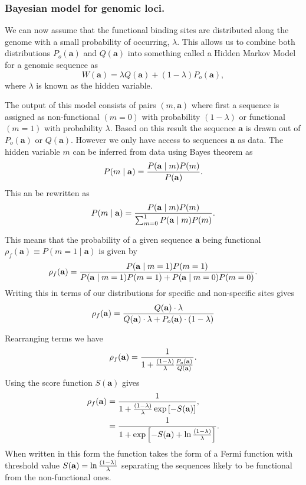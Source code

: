 \subsubsection{Bayesian model for genomic loci.}

We can now assume that the functional binding sites are distributed along the
genome with a small probability of occurring, $\lambda$. This allows us to
combine both distributions $P_o(\mathbf{a})$ and $Q(\mathbf{a})$ into something
called a Hidden Markov Model for a genomic sequence as
\begin{equation}
  W(\mathbf{a}) = \lambda Q(\mathbf{a}) + (1 - \lambda) P_o(\mathbf{a}),
\end{equation}
where $\lambda$ is known as the hidden variable.

The output of this model consists of pairs $(m, \mathbf{a})$ where first a
sequence is assigned as non-functional $(m=0)$ with probability $(1 - \lambda)$
or functional $(m=1)$ with probability $\lambda$. Based on this result the
sequence $\mathbf{a}$ is drawn out of $P_o(\mathbf{a})$ or $Q(\mathbf{a})$.
However we only have access to sequences $\mathbf{a}$ as data. The hidden
variable $m$ can be inferred from data using Bayes theorem as
\begin{equation}
  P(m \mid \mathbf{a}) = {P(\mathbf{a} \mid m) P(m) \over P(\mathbf{a})}.
\end{equation}
This an be rewritten as
\begin{equation}
  P(m \mid \mathbf{a}) = {P(\mathbf{a} \mid m) P(m) \over
  \sum_{m=0}^1 P(\mathbf{a} \mid m) P(m)}.
\end{equation}

This means that the probability of a given sequence $\mathbf{a}$ being
functional $\rho_f(\mathbf{a}) \equiv P(m=1\mid \mathbf{a})$ is given by
\begin{equation}
  \rho_f(\mathbf{a}) = {P(\mathbf{a} \mid m=1) P(m=1) \over
  P(\mathbf{a} \mid m=1) P(m=1) + P(\mathbf{a} \mid m=0) P(m=0)}.
\end{equation}
Writing this in terms of our distributions for specific and non-specific sites
gives
\begin{equation}
  \rho_f(\mathbf{a}) = {Q(\mathbf{a}) \cdot \lambda \over
  Q(\mathbf{a}) \cdot \lambda + P_o(\mathbf{a}) \cdot (1 - \lambda)}
\end{equation}

Rearranging terms we have
\begin{equation}
  \rho_f(\mathbf{a}) = {1 \over 1 + {(1 - \lambda) \over \lambda}
  {P_o(\mathbf{a}) \over Q(\mathbf{a})}}.
\end{equation}
Using the score function $S(\mathbf{a})$ gives
\begin{align}
  \rho_f(\mathbf{a}) &= {1  \over 1 + {(1 - \lambda) \over \lambda}
  \exp\left[ - S(\mathbf{a}) \right]},\\
  &= {1  \over 1 + \exp\left[ - S(\mathbf{a}) + \ln {(1 - \lambda) \over
  \lambda} \right]}.
\end{align}
When written in this form the function takes the form of a Fermi function with
threshold value $S(\mathbf{a}) = \ln {(1 - \lambda) \over \lambda}$ separating
the sequences likely to be functional from the non-functional ones.


